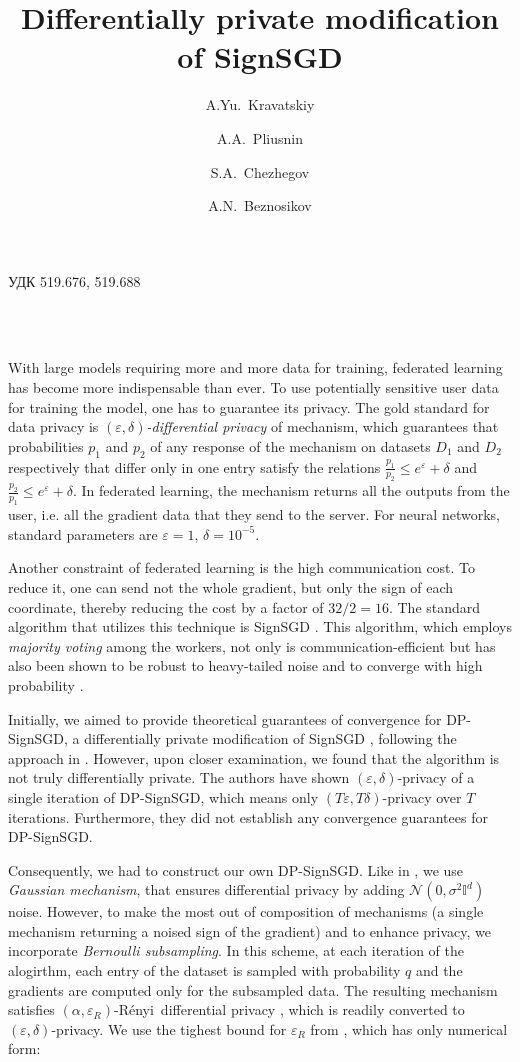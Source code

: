 \documentclass[a4paper, 12pt]{article}
\title{\textbf{Differentially private modification of SignSGD}}
\author[]{A.Yu.~Kravatskiy}
\author[]{A.A.~Pliusnin}
\author[]{S.A.~Chezhegov}
\author[]{A.N.~Beznosikov}
\affil[]{Moscow Institute of Physics and Technology}
\date{} %
\makeatletter
\renewcommand\maketitle{\par
  \begingroup
    \renewcommand\thefootnote{\@fnsymbol\c@footnote}%
    \def\@makefnmark{\rlap{\@textsuperscript{\normalfont\@thefnmark}}}%
    \long\def\@makefntext##1{\parindent 1em\noindent
            \hb@xt@1.8em{%
                \hss\@textsuperscript{\normalfont\@thefnmark}}##1}%
    \if@twocolumn
      \ifnum \col@number=\@ne
        \@maketitle
      \else
        \twocolumn[\@maketitle]%
      \fi
    \else
      \newpage
      \global\@topnum\z@
      \@maketitle
    \fi
    \thispagestyle{empty}\@thanks
  \endgroup
  \setcounter{footnote}{0}%
  \global\let\thanks\relax
  \global\let\maketitle\relax
  \global\let\@maketitle\relax
  \global\let\@thanks\@empty
  \global\let\@author\@empty
  \global\let\@date\@empty
  \global\let\@title\@empty
  \global\let\title\relax
  \global\let\author\relax
  \global\let\date\relax
  \global\let\and\relax
}
\renewcommand{\maketitle}{
  \begin{center}
    \fontsize{15}{12}\selectfont
    \textbf{\@title} \\
    \vspace{0.5em}
    \@author \\
    \vspace{0.5em}
    \@date
  \end{center}
  \vspace{-0.5em}
}
\renewcommand{\and}{\\} %
\newcommand{\eps}{\varepsilon}
\newcommand{\renyi}{R\'enyi}
\makeatother
\begin{document}
\noindent\foreignlanguage{russian}{УДК 519.676, 519.688}\vspace{-0.5em}
\maketitle
With large models requiring more and more data for training, federated learning has become more indispensable than ever. To use potentially sensitive user data for training the model, one has to guarantee its privacy. The gold standard for data privacy is \emph{$(\eps, \delta)$-differential privacy} \cite{Dwork2014} of mechanism, which guarantees that probabilities $p_1$ and $p_2$ of any response of the mechanism on datasets $D_1$ and $D_2$ respectively that differ only in one entry satisfy the relations $\frac{p_1}{p_2} \leq e^{\eps} + \delta$ and $\frac{p_2}{p_1} \leq e^{\eps} + \delta$. In federated learning, the mechanism returns all the outputs from the user, i.e. all the gradient data that they send to the server. For neural networks, standard parameters are $\eps = 1$, $\delta = 10^{-5}$. 

Another constraint of federated learning is the high communication cost. To reduce it, one can send not the whole gradient, but only the sign of each coordinate, thereby reducing the cost by a factor of $32/2 = 16$. The standard algorithm that utilizes this technique is SignSGD \cite{Bernstein2018}. This algorithm, which employs \emph{majority voting} among the workers, not only is communication-efficient but has also been shown to be robust to heavy-tailed noise and to converge with high probability \cite{Kornilov2025}.

Initially, we aimed to provide theoretical guarantees of convergence for DP-SignSGD, a differentially private modification of SignSGD \cite{Jin2020}, following the approach in \cite{Kornilov2025}. However, upon closer examination, we found that the algorithm is not truly differentially private. The authors have shown $(\eps, \delta)$-privacy of a single iteration of DP-SignSGD, which means only $(T\eps, T\delta)$-privacy over $T$ iterations. Furthermore, they did not establish any convergence guarantees for DP-SignSGD.

Consequently, we had to construct our own DP-SignSGD. Like in \cite{Jin2020}, we use \emph{Gaussian mechanism}, that ensures differential privacy by adding $\mathcal{N}(0,\sigma^2\mathbb{I}^d)$ noise. However, to make the most out of composition of mechanisms (a single mechanism returning a noised sign of the gradient) and to enhance privacy, we incorporate \emph{Bernoulli subsampling}. In this scheme, at each iteration of the alogirthm, each entry of the dataset is sampled with probability $q$ and the gradients are computed only for the subsampled data. The resulting mechanism satisfies $(\alpha, \eps_R)$-\renyi\ differential privacy \cite{mironov2019SGM}, which is readily converted to $(\eps, \delta)$-privacy. We use the tighest bound for $\eps_R$ from \cite{mironov2019SGM}, which has only numerical form:
\end{document}

